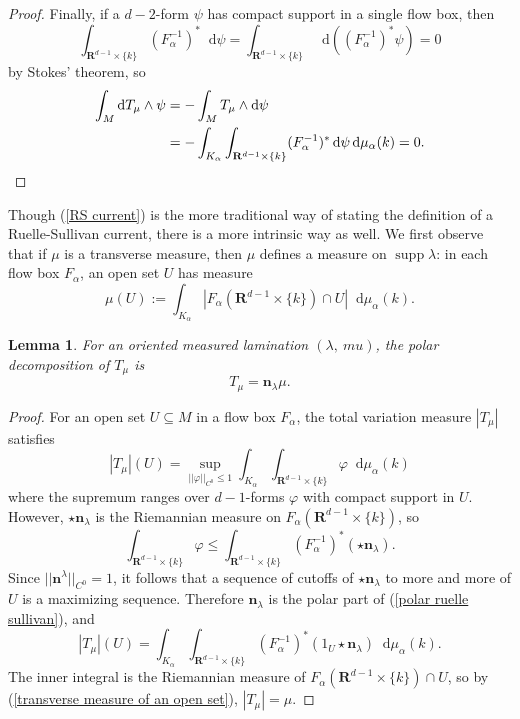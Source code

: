 \documentclass[reqno,11pt]{amsart}
\newcommand{\RR}{\mathbf{R}}
\newcommand*\dif{\mathop{}\!\mathrm{d}}
\DeclareMathOperator{\supp}{supp}
\newcommand{\normal}{\mathbf n}
\newtheorem{lemma}[theorem]{Lemma}
\theoremstyle{definition}
\numberwithin{equation}{section}
\begin{document}
\begin{proof}
Finally, if a $d-2$-form $\psi$ has compact support in a single flow box, then
$$\int_{\RR^{d - 1} \times \{k\}} (F_\alpha^{-1})^* \dif \psi = \int_{\RR^{d - 1} \times \{k\}} \dif((F_\alpha^{-1})^* \psi) = 0$$
by Stokes' theorem, so
\begin{align*}
\int_M \dif T_\mu \wedge \psi &= -\int_M T_\mu \wedge \dif \psi \\
&= -\int_{K_\alpha} \int_{\RR^{d - 1} \times \{k\}} (F_\alpha^{-1})^* \dif \psi \dif \mu_\alpha(k) = 0. \qedhere
\end{align*}
\end{proof}

Though (\ref{RS current}) is the more traditional way of stating the definition of a Ruelle-Sullivan current, there is a more intrinsic way as well.
We first observe that if $\mu$ is a transverse measure, then $\mu$ defines a measure on $\supp \lambda$: in each flow box $F_\alpha$, an open set $U$ has measure
\begin{equation}\label{transverse measure of an open set}
\mu(U) := \int_{K_\alpha} |F_\alpha(\RR^{d - 1} \times \{k\}) \cap U| \dif \mu_\alpha(k).
\end{equation}

\begin{lemma}
For an oriented measured lamination $(\lambda, \  mu)$, the polar decomposition of $T_\mu$ is
\begin{equation}\label{polar ruelle sullivan}
T_\mu = \normal_\lambda \mu.
\end{equation}
\end{lemma}
\begin{proof}
For an open set $U \subseteq M$ in a flow box $F_\alpha$, the total variation measure $|T_\mu|$ satisfies
$$|T_\mu|(U) = \sup_{||\varphi||_{C^0} \leq 1} \int_{K_\alpha} \int_{\RR^{d - 1} \times \{k\}} \varphi \dif \mu_\alpha(k)$$
where the supremum ranges over $d-1$-forms $\varphi$ with compact support in $U$.
However, $\star \normal_\lambda$ is the Riemannian measure on $F_\alpha(\RR^{d - 1} \times \{k\})$, so
$$\int_{\RR^{d - 1} \times \{k\}} \varphi \leq \int_{\RR^{d - 1} \times \{k\}} (F_\alpha^{-1})^*(\star \normal_\lambda).$$
Since $||\normal^\lambda||_{C^0} = 1$, it follows that a sequence of cutoffs of $\star \normal_\lambda$ to more and more of $U$ is a maximizing sequence.
Therefore $\normal_\lambda$ is the polar part of (\ref{polar ruelle sullivan}), and
$$|T_\mu|(U) = \int_{K_\alpha} \int_{\RR^{d - 1} \times \{k\}} (F_\alpha^{-1})^*(1_U \star \normal_\lambda) \dif \mu_\alpha(k).$$
The inner integral is the Riemannian measure of $F_\alpha(\RR^{d - 1} \times \{k\}) \cap U$, so by (\ref{transverse measure of an open set}), $|T_\mu| = \mu$.
\end{proof}
\end{document}
